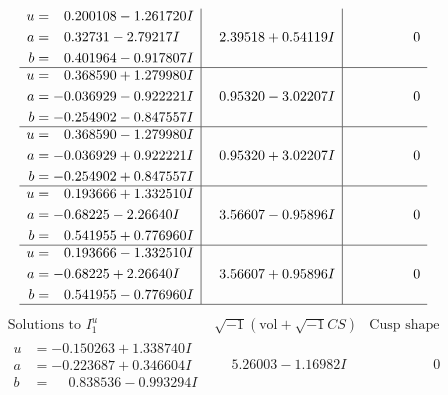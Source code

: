 \documentclass[1p]{elsarticle_modified}
\theoremstyle{definition}
\newcommand{\I}{\sqrt{-1}}
\begin{document}
$$\begin{array}{c|c|c}
\begin{aligned}
u &= \phantom{-}0.200108 - 1.261720 I \\
a &= \phantom{-}0.32731 - 2.79217 I \\
b &= \phantom{-}0.401964 - 0.917807 I\end{aligned}
 & \phantom{-}2.39518 + 0.54119 I & \phantom{-0.000000 } 0 \\ \hline\begin{aligned}
u &= \phantom{-}0.368590 + 1.279980 I \\
a &= -0.036929 - 0.922221 I \\
b &= -0.254902 - 0.847557 I\end{aligned}
 & \phantom{-}0.95320 - 3.02207 I & \phantom{-0.000000 } 0 \\ \hline\begin{aligned}
u &= \phantom{-}0.368590 - 1.279980 I \\
a &= -0.036929 + 0.922221 I \\
b &= -0.254902 + 0.847557 I\end{aligned}
 & \phantom{-}0.95320 + 3.02207 I & \phantom{-0.000000 } 0 \\ \hline\begin{aligned}
u &= \phantom{-}0.193666 + 1.332510 I \\
a &= -0.68225 - 2.26640 I \\
b &= \phantom{-}0.541955 + 0.776960 I\end{aligned}
 & \phantom{-}3.56607 - 0.95896 I & \phantom{-0.000000 } 0 \\ \hline\begin{aligned}
u &= \phantom{-}0.193666 - 1.332510 I \\
a &= -0.68225 + 2.26640 I \\
b &= \phantom{-}0.541955 - 0.776960 I\end{aligned}
 & \phantom{-}3.56607 + 0.95896 I & \phantom{-0.000000 } 0\\
 \hline 
 \end{array}$$\newpage$$\begin{array}{c|c|c}  
\text{Solutions to }I^u_{1}& \I (\text{vol} + \sqrt{-1}CS) & \text{Cusp shape}\\
 \hline 
\begin{aligned}
u &= -0.150263 + 1.338740 I \\
a &= -0.223687 + 0.346604 I \\
b &= \phantom{-}0.838536 - 0.993294 I\end{aligned}
 & \phantom{-}5.26003 - 1.16982 I & \phantom{-0.000000 } 0 \\ \hline\begin{aligned}

\end{aligned}
\end{array}$$
\end{document}
